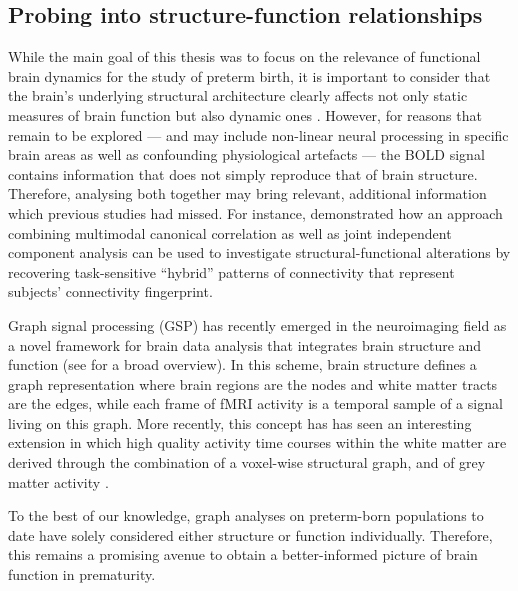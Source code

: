\subsection*{Probing into structure-function relationships}
While the main goal of this thesis was to focus on the relevance of functional brain dynamics for the study of preterm birth, it is important to consider that the brain's underlying structural architecture clearly affects not only static measures of brain function \citep{Honey2009} but also dynamic ones \citep{Hansen2015}. However, for reasons that remain to be explored --- and may include non-linear neural processing in specific brain areas as well as confounding physiological artefacts --- the BOLD signal contains information that does not simply reproduce that of brain structure. Therefore, analysing both together may bring relevant, additional information which previous studies had missed. For instance, \citet{Amico2018} demonstrated how an approach combining multimodal canonical correlation as well as joint independent component analysis can be used to investigate structural-functional alterations by recovering task-sensitive “hybrid” patterns of connectivity that represent subjects' connectivity fingerprint.

Graph signal processing (GSP) has recently emerged in the neuroimaging field as a novel framework for brain data analysis that integrates brain structure and function (see \citet{Huang2018} for a broad overview). In this scheme, brain structure defines a graph representation where brain regions are the nodes and white matter tracts are the edges, while each frame of fMRI activity is a temporal sample of a signal living on this graph. More recently, this concept has has seen an interesting extension in which high quality activity time courses within the white matter are derived through the combination of a voxel-wise structural graph, and of grey matter activity \citep{Tarun2020}.

To the best of our knowledge, graph analyses on preterm-born populations to date have solely considered either structure or function individually. Therefore, this remains a promising avenue to obtain a better-informed picture of brain function in prematurity.




